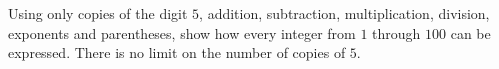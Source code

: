 Using only copies of the digit $5$, addition, subtraction, multiplication, division, exponents and parentheses, show how every integer from $1$ through $100$ can be expressed. There is no limit on the number of copies of $5$.

